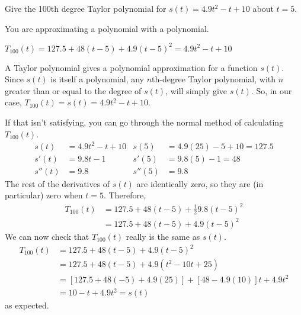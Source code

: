 \begin{Mquestion}
Give the 100th degree Taylor polynomial for $s(t)=4.9t^2-t+10$ about $t=5$.
\end{Mquestion}
\begin{hint}
You are approximating a polynomial with a polynomial.
\end{hint}
\begin{answer}
$T_{100}(t)=127.5+48(t-5)+4.9(t-5)^2=4.9t^2-t+10$
\end{answer}
\begin{solution}
A Taylor polynomial gives a polynomial approximation for a function $s(t)$. Since $s(t)$ is itself a polynomial, any $n$th-degree Taylor polynomial, with $n$ greater than or equal to the degree of $s(t)$, will simply give $s(t)$. So, in our case, $T_{100}(t)=s(t)=4.9t^2-t+10$.
\medskip

If that isn't satisfying, you can go through the normal method of calculating $T_{100}(t)$.
\begin{align*}
s(t)&=4.9t^2-t+10 & s(5)&=4.9(25)-5+10=127.5\\
s'(t)&=9.8t-1 & s'(5)&=9.8(5)-1=48\\
s''(t)&=9.8 & s''(5)&=9.8
\end{align*}
The rest of the derivatives of $s(t)$ are identically zero, so they are (in particular) zero when $t=5$. Therefore,
\begin{align*}
T_{100}(t)&=127.5+48(t-5)+\frac{1}{2}9.8(t-5)^2\\
&=127.5+48(t-5)+4.9(t-5)^2
\end{align*}
We can now check that $T_{100}(t)$ really is the same as $s(t)$.
\begin{align*}
T_{100}(t)&=127.5+48(t-5)+4.9(t-5)^2\\
&=127.5+48(t-5)+4.9(t^2-10t+25)\\
&=[127.5+48(-5)+4.9(25)]+[48-4.9(10)]t+4.9t^2\\
&=10-t+4.9t^2=s(t)
\end{align*}
as expected.
\end{solution}

